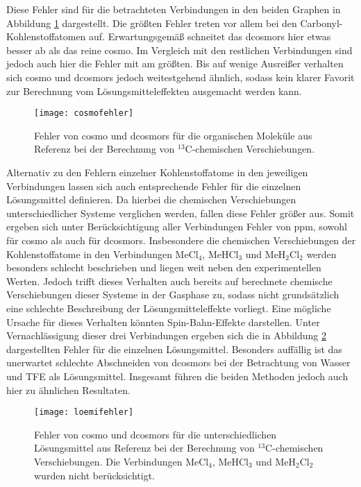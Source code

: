     Diese Fehler sind für die betrachteten Verbindungen in den beiden Graphen in Abbildung \ref{abb:cosmofehler} dargestellt. Die größten Fehler treten vor allem bei den Carbonyl-Kohlenstoffatomen auf. Erwartungsgemäß schneitet das \ac{dcosmors} hier etwas besser ab als das reine \ac{cosmo}. Im Vergleich mit den restlichen Verbindungen sind jedoch auch hier die Fehler mit am größten. Bis auf wenige Ausreißer verhalten sich \ac{cosmo} und \ac{dcosmors} jedoch weitestgehend ähnlich, sodass kein klarer Favorit zur Berechnung vom Lösungsmitteleffekten ausgemacht werden kann.
   	\begin{figure}[ht!]
	\centering
	\texttt{[image: cosmofehler]}
	\captionsetup{figurewithin = chapter}
	\captionsetup{font=small, labelfont=bf}\caption[{Fehler von \ac{cosmo} und \ac{dcosmors} für $^{13}$C-chemische Verschiebungen}]{Fehler von \ac{cosmo} und \ac{dcosmors} für die organischen Moleküle aus Referenz \cite{fulmer2010nmr} bei der Berechnung von $^{13}$C-chemischen Verschiebungen.}
	\label{abb:cosmofehler}
	\end{figure} 
\vfill
\FloatBarrier
\newpage
	Alternativ zu den Fehlern einzelner Kohlenstoffatome in den jeweiligen Verbindungen lassen sich auch entsprechende Fehler für die einzelnen Lösungsmittel definieren. Da hierbei die chemischen Verschiebungen unterschiedlicher Systeme verglichen werden, fallen diese Fehler größer aus. Somit ergeben sich unter Berücksichtigung aller Verbindungen Fehler von \unit[10--11]{ppm}, sowohl für \ac{cosmo} als auch für \ac{dcosmors}. Insbesondere die chemischen Verschiebungen der Kohlenstoffatome in den Verbindungen MeCl$_4$, MeHCl$_3$ und MeH$_2$Cl$_2$ werden besonders schlecht beschrieben und liegen weit neben den experimentellen Werten. Jedoch trifft dieses Verhalten auch bereits auf berechnete chemische Verschiebungen dieser Systeme in der Gasphase zu, sodass nicht grundsätzlich eine schlechte Beschreibung der Lösungsmitteleffekte vorliegt. Eine mögliche Ursache für dieses Verhalten könnten Spin-Bahn-Effekte darstellen.\supercite{yannickpers} Unter Vernachlässigung dieser drei Verbindungen ergeben sich die in Abbildung \ref{abb:loemifehler} dargestellten Fehler für die einzelnen Lösungsmittel. Besonders auffällig ist das unerwartet schlechte Abschneiden von \ac{dcosmors} bei der Betrachtung von Wasser und TFE als Lösungsmittel. Insgesamt führen die beiden Methoden jedoch auch hier zu ähnlichen Resultaten.
\vspace{2.0cm}
   	\begin{figure}[ht!]
	\centering
	\texttt{[image: loemifehler]}
	\captionsetup{figurewithin = chapter}
	\captionsetup{font=small, labelfont=bf}\caption[{Fehler von \ac{cosmo} und \ac{dcosmors} für unterschiedliche Lösungsmittel}]{Fehler von \ac{cosmo} und \ac{dcosmors} für die unterschiedlichen Lösungsmittel aus Referenz \cite{fulmer2010nmr} bei der Berechnung von $^{13}$C-chemischen Verschiebungen. Die Verbindungen MeCl$_4$, MeHCl$_3$ und MeH$_2$Cl$_2$ wurden nicht berücksichtigt.}
	\label{abb:loemifehler}
	\end{figure}    	
\vfil
\newpage
	
